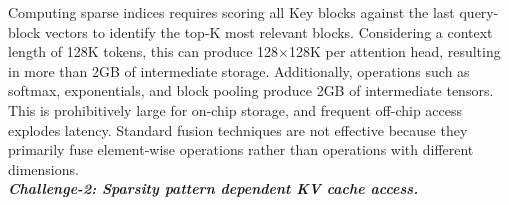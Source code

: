 \documentclass[conference]{IEEEtran}
\begin{document}
Computing sparse indices requires scoring all Key blocks against the last query-block vectors to identify the top-K most relevant blocks. Considering a context length of 128K tokens, this can produce 128$\times$128K per attention head, resulting in more than 2GB of intermediate storage. Additionally, operations such as softmax, exponentials, and block pooling produce 2GB of intermediate tensors. This is prohibitively large for on-chip storage, and frequent off-chip access explodes latency. Standard fusion techniques are not effective because they primarily fuse element-wise operations rather than operations with different dimensions.\\    
\textbf{\textit{Challenge-2: Sparsity pattern dependent KV cache access.}} 


\end{document}

